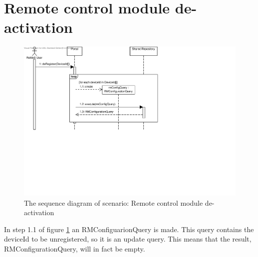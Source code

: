 \section{Remote control module de-activation}

\begin{figure}[H]
	\begin{centering}
		\includegraphics[width=\textwidth]{figs/scenario-5-12.pdf}
		\caption{The sequence diagram of scenario: Remote control module
		de-activation}
		\label{fig:scenario-5-12}
	\end{centering}
\end{figure}

\npar In step 1.1 of figure \ref{fig:scenario-5-12} an RMConfiguarionQuery is
made. This query contains the deviceId to be unregistered, so it is an
update query. This means that the result, RMConfigurationQuery, will in fact be
empty.
